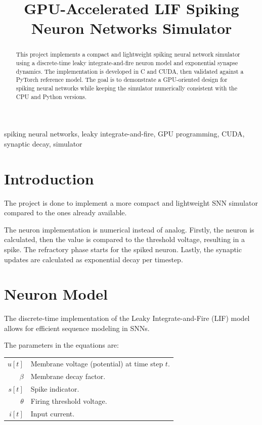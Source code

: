 \documentclass[conference]{IEEEtran}
\title{GPU-Accelerated LIF Spiking Neuron Networks Simulator}
\author{\IEEEauthorblockN{Emre Sagir}
\IEEEauthorblockA{\textit{Computer Engineering (GPU Programming Class)} \\
\textit{Politecnico di Torino}\\
Torino, Italy \\
s339049@studenti.polito.it}
}
\begin{document}
\maketitle

\begin{abstract}
This project implements a compact and lightweight spiking neural network simulator using a discrete-time leaky integrate-and-fire neuron model and exponential synapse dynamics. The implementation is developed in C and CUDA, then validated against a PyTorch reference model. The goal is to demonstrate a GPU-oriented design for spiking neural networks while keeping the simulator numerically consistent with the CPU and Python versions.
\end{abstract}

\begin{IEEEkeywords}
spiking neural networks, leaky integrate-and-fire, GPU programming, CUDA, synaptic decay, simulator
\end{IEEEkeywords}

\section{Introduction}

The project is done to implement a more compact and lightweight SNN simulator compared to the ones already available.

The neuron implementation is numerical instead of analog. Firstly, the neuron is calculated, then the value is compared to the threshold voltage, resulting in a spike. The refractory phase starts for the spiked neuron. Lastly, the synaptic updates are calculated as exponential decay per timestep.

\section{Neuron Model}

The discrete-time implementation of the Leaky Integrate-and-Fire (LIF) model allows for efficient sequence modeling in SNNs.

The parameters in the equations are:

\begin{tabular}{r l}
  $u[t]$ & Membrane voltage (potential) at time step $t$. \\[0.5em]
  $\beta$ & Membrane decay factor. \\[0.5em]
  $s[t]$ & Spike indicator. \\[0.5em]
  $\theta$ & Firing threshold voltage. \\[0.5em]
  $i[t]$ & Input current.
\end{tabular}
\end{document}
